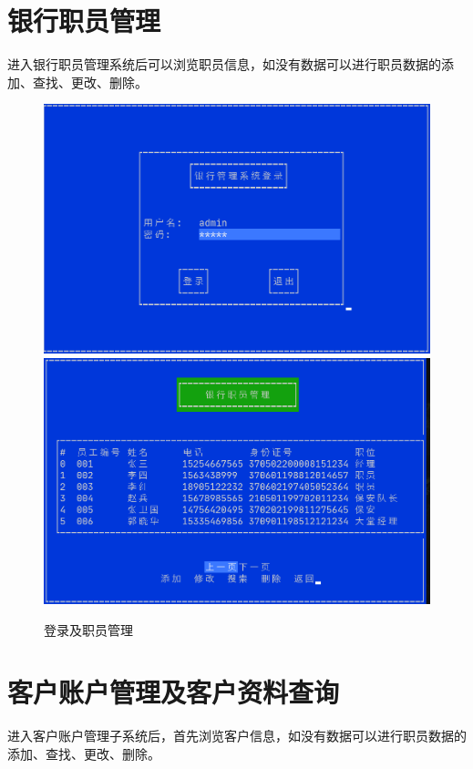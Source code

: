 \documentclass{ctexrep}
\begin{document}
\section{银行职员管理}
进入银行职员管理系统后可以浏览职员信息，如没有数据可以进行职员数据的添加、查找、更改、删除。\\
\begin{figure}[H]
  \centering\includegraphics[scale=0.45]{preview_login.png}
  \includegraphics[scale=0.45]{preview_staff.png}
  \caption{登录及职员管理}
\end{figure}
\section{客户账户管理及客户资料查询}
进入客户账户管理子系统后，首先浏览客户信息，如没有数据可以进行职员数据的添加、查找、更改、删除。
\end{document}

